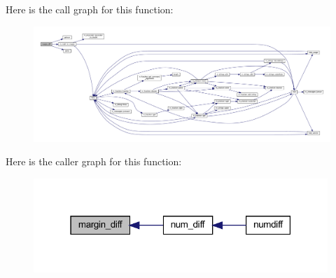 Here is the call graph for this function\+:
\nopagebreak
\begin{figure}[H]
\begin{center}
\leavevmode
\includegraphics[width=350pt]{numdiff_8f90_a5d78de65cd7fa1c21f36db3018f1ffaf_cgraph}
\end{center}
\end{figure}
Here is the caller graph for this function\+:
\nopagebreak
\begin{figure}[H]
\begin{center}
\leavevmode
\includegraphics[width=315pt]{numdiff_8f90_a5d78de65cd7fa1c21f36db3018f1ffaf_icgraph}
\end{center}
\end{figure}
\mbox{\label{numdiff_8f90_a5bf0d2166ed3d2cb137b6084621a231f}} 
